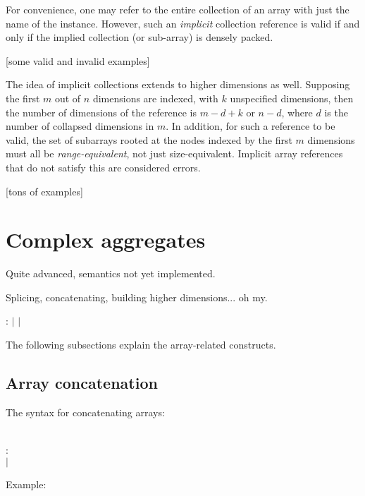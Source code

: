 For convenience, one may refer to the entire collection
of an array with just the name of the instance.  
However, such an \emph{implicit} collection reference is valid
if and only if the implied collection (or sub-array) is densely packed.  

[some valid and invalid examples]

The idea of implicit collections extends to higher dimensions as well.  
Supposing the first $m$ out of $n$ dimensions are indexed, 
with $k$ unspecified dimensions, then the number of dimensions of the 
reference is $m-d+k$ or $n-d$,
where $d$ is the number of collapsed dimensions in $m$.  
In addition, for such a reference to be valid, 
the set of subarrays rooted at the nodes indexed by the 
first $m$ dimensions must all be \emph{range-equivalent}, 
not just size-equivalent.  
Implicit array references that do not satisfy this are considered errors.  

[tons of examples]

\section{Complex aggregates}
\label{sec:arrays:aggregate}

Quite advanced, semantics not yet implemented.  

Splicing, concatenating, building higher dimensions... oh my.  

\noindent
{}
: 
$|$ 
$|$ 

The following subsections explain the array-related constructs.  

\subsection{Array concatenation}
\label{sec:arrays:aggregate:concatenation}

The syntax for concatenating arrays:

\noindent
{}\\
:  \ttt{\#} \\
$|$ 

Example:

